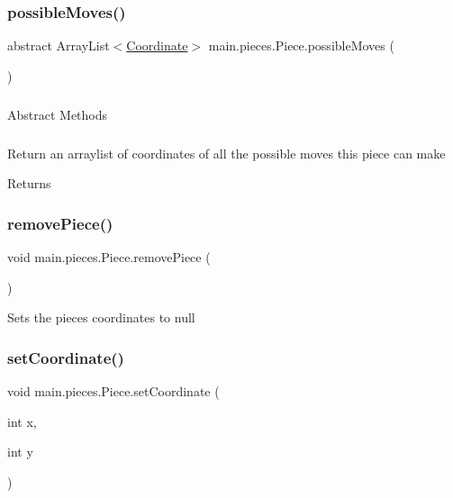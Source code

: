 \subsubsection{\texorpdfstring{possible\+Moves()}{possibleMoves()}}
{\footnotesize\ttfamily abstract Array\+List$<$\hyperlink{classmain_1_1model_1_1_coordinate}{Coordinate}$>$ main.\+pieces.\+Piece.\+possible\+Moves (\begin{DoxyParamCaption}{ }\end{DoxyParamCaption})\hspace{0.3cm}{\ttfamily [abstract]}}

\subparagraph*{}

Abstract Methods \subparagraph*{}

Return an arraylist of coordinates of all the possible moves this piece can make \begin{DoxyReturn}{Returns}

\end{DoxyReturn}
\hypertarget{classmain_1_1pieces_1_1_piece_a58d0ca1c1f09ffd2470a4aec1b7e6854}{}\label{classmain_1_1pieces_1_1_piece_a58d0ca1c1f09ffd2470a4aec1b7e6854} 
\subsubsection{\texorpdfstring{remove\+Piece()}{removePiece()}}
{\footnotesize\ttfamily void main.\+pieces.\+Piece.\+remove\+Piece (\begin{DoxyParamCaption}{ }\end{DoxyParamCaption})}

Sets the pieces coordinates to null \hypertarget{classmain_1_1pieces_1_1_piece_a2ffc0c01f80d164e8d471272061545d9}{}\label{classmain_1_1pieces_1_1_piece_a2ffc0c01f80d164e8d471272061545d9} 
\subsubsection{\texorpdfstring{set\+Coordinate()}{setCoordinate()}}
{\footnotesize\ttfamily void main.\+pieces.\+Piece.\+set\+Coordinate (\begin{DoxyParamCaption}\item[{int}]{x,  }\item[{int}]{y }\end{DoxyParamCaption})}

